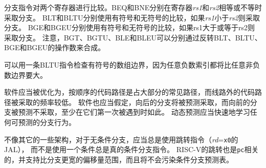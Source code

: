分支指令对两个寄存器进行比较。BEQ和BNE分别在寄存器{\em rs1}和{\em rs2}相等或不等时采取分支。
BLT和BLTU分别使用有符号和无符号的比较，如果{\em rs1}小于{\em rs2}则采取分支。
BGE和BGEU分别使用有符号和无符号的比较，如果rs1大于或等于rs2则采取分支。
注意，BGT、BGTU、BLE和BLEU可以分别通过反转BLT、BLTU、BGE和BGEU的操作数来合成。

\begin{commentary}
可以用一条BLTU指令检查有符号的数组边界，因为任意负数索引都将比任意非负数边界要大。
\end{commentary}

软件应当被优化为，按顺序的代码路径是占大部分的常见路径，而线路外的代码路径被采取的频率较低。
软件也应当假定，向后的分支将被预测采取，而向前的分支被预测不采取，至少在它们第一次被遇到时如此。
动态预测应当快速地学习任何可预测的分支行为。

不像其它的一些架构，对于无条件分支，应当总是使用跳转指令（{\em rd}={\tt x0}的JAL），
而不是使用一个条件总是真的条件分支指令。
RISC-V的跳转也是{\tt pc}相关的，并支持比分支更宽的偏移量范围，而且将不会污染条件分支预测表。

